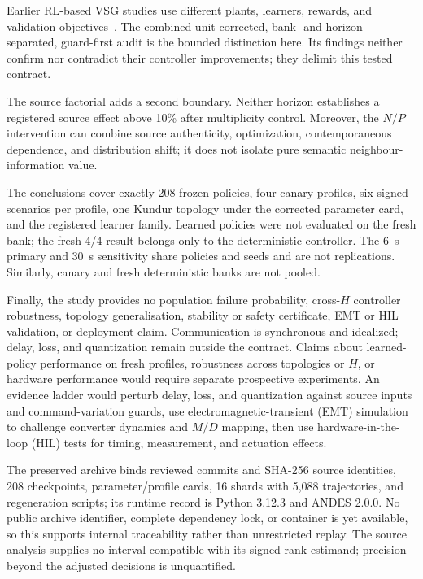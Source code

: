 \documentclass[conference,a4paper]{IEEEtran}
\begin{document}
Earlier RL-based VSG studies use different plants, learners, rewards, and
validation objectives~\cite{yang2023ddic,lu2024sac,zhang2024maddpg,
kang2025madrl}. The combined unit-corrected, bank- and horizon-separated,
guard-first audit is the bounded distinction here. Its findings neither confirm
nor contradict their controller improvements; they delimit this tested contract.

The source factorial adds a second boundary. Neither horizon establishes a
registered source effect above 10\% after multiplicity control. Moreover, the
$N/P$ intervention can combine source authenticity, optimization,
contemporaneous dependence, and distribution shift; it does not isolate pure
semantic neighbour-information value.

The conclusions cover exactly 208 frozen policies, four canary profiles, six
signed scenarios per profile, one Kundur topology under the corrected parameter
card, and the registered learner family. Learned policies were not evaluated on the fresh bank; the
fresh 4/4 result belongs only to the deterministic controller. The \SI{6}{s}
primary and \SI{30}{s} sensitivity share policies and seeds and are not
replications. Similarly, canary and fresh deterministic banks are not pooled.

Finally, the study provides no population failure probability, cross-$H$
controller robustness, topology generalisation, stability or safety
certificate, EMT or HIL validation, or deployment claim. Communication is
synchronous and idealized; delay, loss, and quantization remain outside the
contract. Claims about learned-policy performance on fresh profiles,
robustness across topologies or $H$, or hardware performance would require
separate prospective experiments.
An evidence ladder would perturb delay, loss, and quantization against source
inputs and command-variation guards, use electromagnetic-transient (EMT)
simulation to challenge converter dynamics and $M/D$ mapping, then use
hardware-in-the-loop (HIL) tests for timing, measurement, and actuation effects.

The preserved archive binds reviewed commits and SHA-256 source identities, 208
checkpoints, parameter/profile cards, 16 shards with 5,088 trajectories, and
regeneration scripts; its runtime record is Python 3.12.3 and ANDES 2.0.0. No
public archive identifier, complete dependency lock, or container is yet
available, so this supports internal traceability rather than unrestricted
replay. The source analysis supplies no interval compatible with its signed-rank
estimand; precision beyond the adjusted decisions is unquantified.
\end{document}
